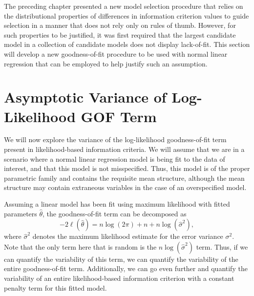 \doublespace
{}

	The preceding chapter presented a new model selection procedure that relies on the distributional properties of differences in information criterion values to guide
	selection in a manner that does not rely only on rules of thumb. However, for such properties to be justified, it was first required that the largest candidate model
	in a collection of candidate models does not display lack-of-fit. This section will develop a new goodness-of-fit procedure to be used with normal linear regression
	that can be employed to help justify such an assumption.
		
		\section{Asymptotic Variance of Log-Likelihood GOF Term} \label{sec:asymp_var}

		We will now explore the variance of the log-likelihood goodness-of-fit term present in likelihood-based information criteria. We will assume that we are in a
		scenario where a normal linear regression model is being fit to the data of interest, and that this model is not misspecified. Thus, this model is of the proper
		parametric family and contains the requisite mean structure, although the mean structure may contain extraneous variables in the
		case of an overspecified model.

		Assuming a linear model has been fit using maximum likelihood with fitted parameters $\hat{\theta}$, the goodness-of-fit term can be decomposed as
		\begin{equation}
			-2 \ell (\hat{\theta}  ) = n \log(2 \pi) + n + n \log(\hat{\sigma}^2 ) ,
		\end{equation}
		where $\hat{\sigma}^2$ denotes the maximum likelihood estimate for the error variance $\sigma^2$. Note that the only term here that is random is
		the $n \log(\hat{\sigma}^2)$ term. Thus, if we can quantify the variability of this term, we can quantify the variability of the entire goodness-of-fit
		term. Additionally, we can go even further and quantify the variability of an entire likelihood-based information criterion with a constant penalty
		term for this fitted model.


